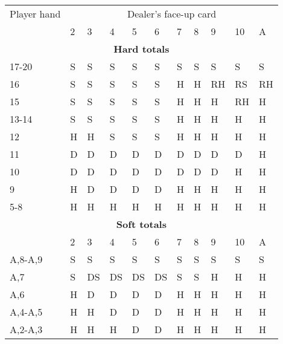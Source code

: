 \documentclass[conference]{IEEEtran}
\begin{document}
\begin{table}[ht]
\tiny
\centering
\begin{tabular}{|l|l|l|l|l|l|l|l|l|l|l|}
\hline

{Player hand} & \multicolumn{10}{c|}{Dealer's face-up card}     \\ \cline{2-11} 
                             & 2 & 3 & 4 & 5 & 6 & 7 & 8 & 9 & 10 & A \\ \hline
\multicolumn{11}{|c|}{\textbf{Hard totals}}                           \\ \hline
17-20       								 & S & S & S & S & S & S & S & S & S & S  \\ \hline
16                           & S & S & S & S & S & H & H & RH & RS & RH  \\ \hline
15                           & S & S & S & S & S & H & H & H & RH & H  \\ \hline
13-14                        & S & S & S & S & S & H & H & H & H & H  \\ \hline
12                           & H & H & S & S & S & H & H & H & H & H  \\ \hline
11                           & D & D & D & D & D & D & D & D & D & H  \\ \hline
10                           & D & D & D & D & D & D & D & D & H & H  \\ \hline
9                            & H & D & D & D & D & H & H & H & H & H  \\ \hline
5-8                          & H & H & H & H & H & H & H & H & H & H  \\ \hline

\multicolumn{11}{|c|}{\textbf{Soft totals}}                           \\ \hline
                             & 2 & 3 & 4 & 5 & 6 & 7 & 8 & 9 & 10 & A \\ \hline
A,8-A,9                      & S & S & S & S & S & S & S & S & S & S  \\ \hline
A,7                          & S & DS & DS & DS & DS & S & S & H & H & H  \\ \hline
A,6                          & H & D & D & D & D & H & H & H & H & H  \\ \hline
A,4-A,5                      & H & H & D & D & D & H & H & H & H & H  \\ \hline
A,2-A,3                      & H & H & H & D & D & H & H & H & H & H  \\ \hline


\end{tabular}
\end{table}
\end{document}
